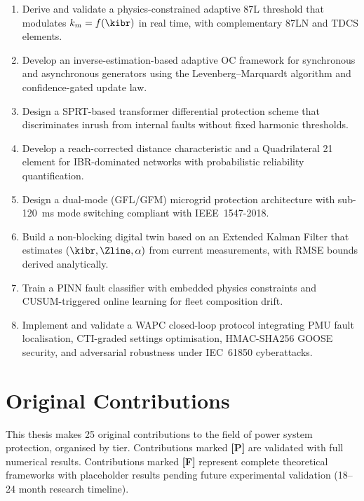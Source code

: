 \begin{enumerate}[label=\textbf{O\arabic*}]
\item \label{O1} Derive and validate a physics-constrained adaptive 87L
      threshold that modulates $k_m = f(\kibr)$ in real time, with
      complementary 87LN and TDCS elements.

\item \label{O2} Develop an inverse-estimation-based adaptive OC framework
      for synchronous and asynchronous generators using the
      Levenberg--Marquardt algorithm and confidence-gated update law.

\item \label{O3} Design a SPRT-based transformer differential protection
      scheme that discriminates inrush from internal faults without
      fixed harmonic thresholds.

\item \label{O4} Develop a reach-corrected distance characteristic and a
      Quadrilateral 21 element for IBR-dominated networks with
      probabilistic reliability quantification.

\item \label{O5} Design a dual-mode (GFL/GFM) microgrid protection
      architecture with sub-120~ms mode switching compliant with
      IEEE~1547-2018.

\item \label{O6} Build a non-blocking digital twin based on an Extended
      Kalman Filter that estimates $(\kibr, \Zline, \alpha)$ from
      current measurements, with RMSE bounds derived analytically.

\item \label{O7} Train a PINN fault classifier with embedded physics
      constraints and CUSUM-triggered online learning for fleet
      composition drift.

\item \label{O8} Implement and validate a WAPC closed-loop protocol
      integrating PMU fault localisation, CTI-graded settings optimisation,
      HMAC-SHA256 GOOSE security, and adversarial robustness under
      IEC~61850 cyberattacks.
\end{enumerate}

\section{Original Contributions}
\label{sec:ch1_contributions}

This thesis makes 25 original contributions to the field of power system
protection, organised by tier. Contributions marked \textbf{[P]} are
validated with full numerical results. Contributions marked \textbf{[F]}
represent complete theoretical frameworks with placeholder results pending
future experimental validation (18--24 month research timeline).

